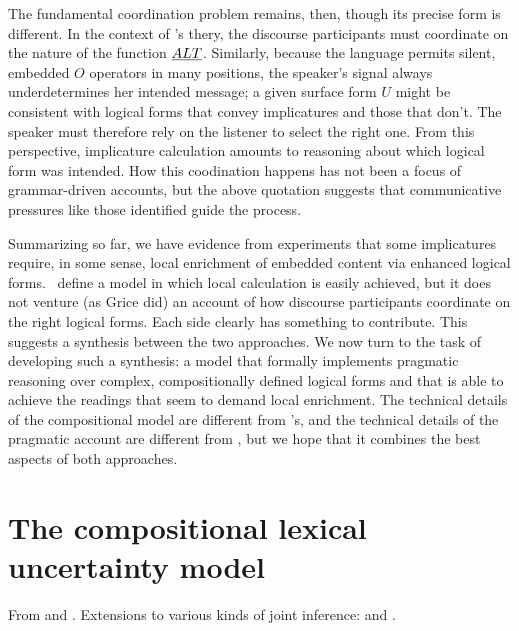 \documentclass{article}
\begin{document}
The fundamental coordination problem remains, then, though its precise
form is different. In the context of \CFS's thery, the discourse
participants must coordinate on the nature of the function $\emph{ALT}$.
Similarly, because the language permits silent, embedded $O$ operators
in many positions, the speaker's signal always underdetermines her
intended message; a given surface form $U$ might be consistent with
logical forms that convey implicatures and those that don't. The
speaker must therefore rely on the listener to select the right one.
From this perspective, implicature calculation amounts to reasoning
about which logical form was intended. How this coodination happens
has not been a focus of grammar-driven accounts, but the above
quotation suggests that communicative pressures like those
\citet{Grice75} identified guide the process.

Summarizing so far, we have evidence from
 experiments that some implicatures
require, in some sense, local enrichment of embedded content via
enhanced logical forms.  \CFS\ define a model in which local
calculation is easily achieved, but it does not venture (as Grice did)
an account of how discourse participants coordinate on the right
logical forms. Each side clearly has something to contribute.  This
suggests a synthesis between the two approaches. We now turn to the
task of developing such a synthesis: a model that formally implements
pragmatic reasoning over complex, compositionally defined logical
forms and that is able to achieve the readings that seem to demand
local enrichment. The technical details of the compositional model are
different from \CFS's, and the technical details of the pragmatic
account are different from \citeauthor{Grice75}, but we hope that it
combines the best aspects of both approaches.


\section{The compositional lexical uncertainty model}\label{sec:model}

From \citet{Bergen:Goodman:Levy:2012} and
\citet{Bergen:Levy:Goodman:2014}. Extensions to various kinds of joint
inference: \citet{Smith:Goodman:Frank:2013} and \citet{Kao-etal:2014}.

\end{document}
